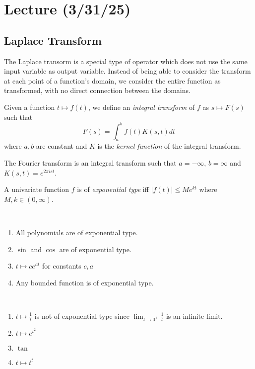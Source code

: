 \documentclass[notes]{subfiles}
\begin{document}
\setcounter{section}{16}
\section{Lecture (3/31/25)}

\subsection{Laplace Transform}
The Laplace transorm is a special type of operator which does not use the same input variable as output variable. Instead of being able to consider the transform at each point of a function's domain, we consider the entire function as transformed, with no direct connection between the domains.

\begin{definition}
    Given a function $t \mapsto f(t)$, we define an \textsl{integral transform} of $f$ as $s \mapsto F(s)$ such that
    \[
        F(s) = \int_a^b f(t)K(s, t)dt
    \]
    where $a, b$ are constant and $K$ is the \textsl{kernel function} of the integral transform.
\end{definition}

\begin{example}
    The Fourier transform is an integral transform such that $a = -\infty$, $b = \infty$ and $K(s, t) = e^{2\pi i st}$.
\end{example}

\begin{definition}
    A univariate function $f$ is of \textsl{exponential type} iff $|f(t)| \leq Me^{kt}$ where $M, k \in (0, \infty)$.
\end{definition}

\begin{example}
    ~\par
    \begin{enumerate}[label = (\arabic*)]
        \item All polynomials are of exponential type.
        \item $\sin$ and $\cos$ are of exponential type.
        \item $t \mapsto ce^{at}$ for constants $c, a$
        \item Any bounded function is of exponential type.
    \end{enumerate}
\end{example}

\begin{example}
    ~\par
    \begin{enumerate}[label = (\arabic*)]
        \item $t \mapsto \frac{1}{t}$ is not of exponential type since $\lim_{t \to 0^+} \frac{1}{t}$ is an infinite limit.
        \item $t \mapsto e^{t^2}$
        \item $\tan$
        \item $t \mapsto t^t$
    \end{enumerate}
\end{example}
\end{document}
